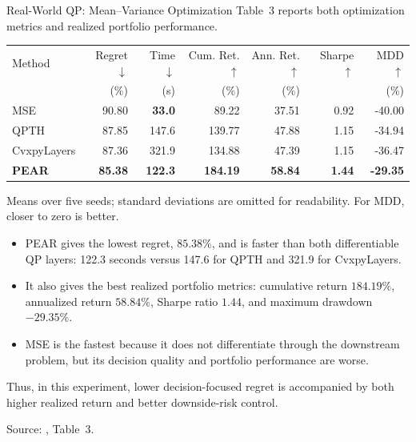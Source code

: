 \begin{frame}{Real-World QP: Mean--Variance Optimization}
    Table~3 reports both optimization metrics and realized portfolio performance.

    \begin{center}
        {\scriptsize
        \setlength{\tabcolsep}{5.0pt}
        \renewcommand{\arraystretch}{1.28}
        \begin{tabular}{lrrrrrr}
            \toprule
            Method & Regret $\downarrow$ & Time $\downarrow$ & Cum. Ret. $\uparrow$ & Ann. Ret. $\uparrow$ & Sharpe $\uparrow$ & MDD $\uparrow$\\
                   & (\%) & (s) & (\%) & (\%) & & (\%)\\
            \midrule
            MSE          & 90.80 & \textbf{33.0} & 89.22  & 37.51 & 0.92 & -40.00\\
            QPTH         & 87.85 & 147.6 & 139.77 & 47.88 & 1.15 & -34.94\\
            CvxpyLayers  & 87.36 & 321.9 & 134.88 & 47.39 & 1.15 & -36.47\\
            \textbf{PEAR} & \textbf{85.38} & \textbf{122.3} & \textbf{184.19} & \textbf{58.84} & \textbf{1.44} & \textbf{-29.35}\\
            \bottomrule
        \end{tabular}}
    \end{center}
    {\footnotesize Means over five seeds; standard deviations are omitted for readability. For MDD, closer to zero is better.}

    \small
    \begin{itemize}
        \item PEAR gives the lowest regret, $85.38\%$, and is faster than both differentiable QP layers: 122.3 seconds versus 147.6 for QPTH and 321.9 for CvxpyLayers.
        \item It also gives the best realized portfolio metrics: cumulative return $184.19\%$, annualized return $58.84\%$, Sharpe ratio $1.44$, and maximum drawdown $-29.35\%$.
        \item MSE is the fastest because it does not differentiate through the downstream problem, but its decision quality and portfolio performance are worse.
    \end{itemize}

    Thus, in this experiment, lower decision-focused regret is accompanied by both higher realized return and better downside-risk control.

    \vfill
    {\tiny Source: \citet{lee2026decisionfocusedlearningtangentspaceprojection}, Table~3.}
\end{frame}

